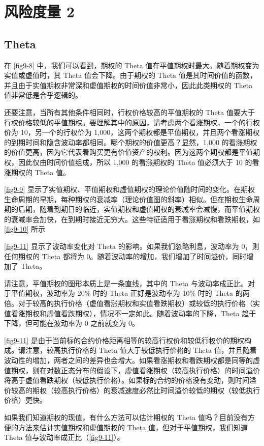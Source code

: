 \chapter{风险度量 2}
\section{Theta}
在 \autoref{fig9-8} 中，我们可以看到，期权的 Theta 值在平值期权时最大。随着期权变为实值或虚值时，其 Theta 值会下降。由于期权的 Theta 值是其时间价值的函数，并且由于实值期权非常深和虚值期权的时间价值非常小，因此此类期权的 Theta 值非常低是合乎逻辑的。

还要注意，当所有其他条件相同时，行权价格较高的平值期权的 Theta 值要大于行权价格较低的平值期权。要理解其中的原因，请考虑两个看涨期权，一个的行权价为 10，另一个的行权价为 1,000，这两个期权都是平值期权，并且两个看涨期权的到期时间和隐含波动率都相同。哪个期权的价值更高？显然，1,000 的看涨期权的价值更高，因为它代表着购买更有价值资产的权利。因为这两个期权都是平值期权，因此仅由时间价值组成，所以 1,000 的看涨期权的 Theta 值必须大于 10 的看涨期权的 Theta 值。


\autoref{fig9-9} 显示了实值期权、平值期权和虚值期权的理论价值随时间的变化。在期权生命周期的早期，每种期权的衰减率（理论价值图的斜率）相似。但在期权生命周期的后期，随着到期日的临近，实值期权和虚值期权的衰减率会减慢，而平值期权的衰减率会加快，在到期时接近无穷大。这些特征适用于看涨期权和看跌期权，如 \autoref{fig9-10} 所示



\autoref{fig9-11} 显示了波动率变化对 Theta 的影响。如果我们忽略利息，波动率为 0，则任何期权的 Theta 都将为 0。随着波动率的增加，我们增加了时间溢价，同时增加了 Theta。


请注意，平值期权的图形本质上是一条直线，其中的 Theta 与波动率成正比。对于平值期权，波动率为 20\% 时的 Theta 正好是波动率为 10\% 时的 Theta 的两倍。对于较高的执行价格（虚值看涨期权和实值看跌期权）或较低的执行价格（实值看涨期权和虚值看跌期权），情况不一定如此。随着波动率的下降，Theta 趋于下降，但可能在波动率为 0 之前就变为 0。

\autoref{fig9-11} 是由于当前标的合约价格距离相等的较高行权价和较低行权价的期权构成。请注意，较高执行价格的 Theta 值大于较低执行价格的 Theta 值，并且随着波动性的增加，两者之间的差异也会增大。如果看涨期权和看跌期权都是同等的虚值期权，则在对数正态分布的假设下，虚值看涨期权（较高执行价格）的时间溢价将高于虚值看跌期权（较低执行价格）。如果标的合约的价格没有变动，则时间溢价较高的期权（较高执行价格）的衰减速度必然比时间溢价较低的期权（较低执行价格）更快。

如果我们知道期权的现值，有什么方法可以估计期权的 Theta 值吗？目前没有方便的方法来估计实值期权和虚值期权的 Theta 值，但对于平值期权，我们知道 Theta 值与波动率成正比（\autoref{fig9-11}）。